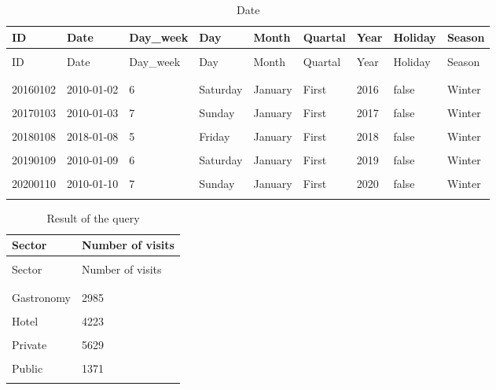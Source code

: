 \documentclass[letterpaper,12pt]{article}
\begin{document}
\begingroup
\renewcommand\arraystretch{0.5}
\begin{longtable}{p{1.5cm}p{2cm}p{1.5cm}p{1.5cm}p{1.3cm}p{1.1cm}p{0.7cm}p{1.1cm}p{1.2cm}}
        \caption{Date} \\
        ID & Date & Day\_week & Day & Month & Quartal & Year & Holiday & Season \\
        \endfirsthead \\
        ID & Date & Day\_week & Day & Month & Quartal & Year & Holiday & Season \\
        \endhead \\
        \hline \\
        20160102 & 2010-01-02 & 6 & Saturday & January & First & 2016 & false & Winter \\
        \hline \\
        20170103 & 2010-01-03 & 7 & Sunday & January & First & 2017 & false & Winter \\
        \hline \\
        20180108 & \color{red} 2018-01-08 & 5 & Friday & January & First & 2018 & false & Winter \\
        \hline \\
        20190109 & 2010-01-09 & 6 & Saturday & January & First & 2019 & false & Winter \\
        \hline \\
        20200110 & 2010-01-10 & 7 & Sunday & January & First & 2020 & false & Winter \\
        \hline \\
\end{longtable} 
\endgroup

\begingroup
\renewcommand\arraystretch{0.5}
\begin{longtable}{p{3cm}p{4cm}}
        \caption{Result of the query} \\
        Sector & Number of visits \\
        \endfirsthead \\
        Sector & Number of visits \\
        \endhead \\
        \hline \\
        Gastronomy & 2985 \\
        \hline \\
        Hotel & 4223 \\
        \hline \\
        Private & 5629 \\
        \hline \\
        Public & 1371 \\
        \hline \\
\end{longtable} 
\endgroup
\end{document}
